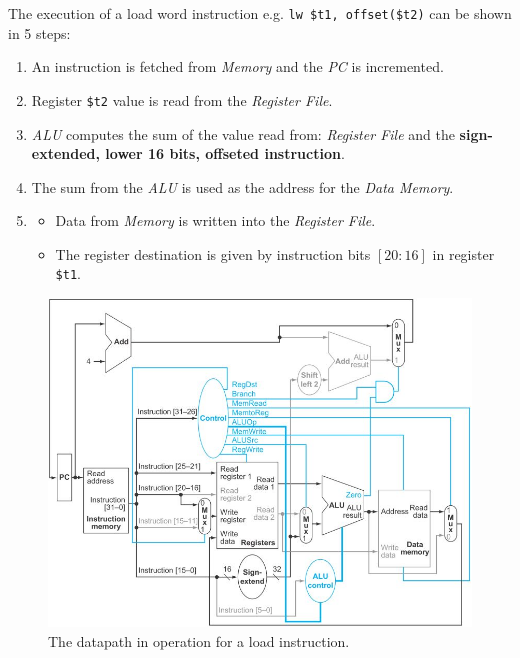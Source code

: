 \documentclass[10pt,a4paper]{article}
\begin{document}
\pagebreak

The execution of a load word instruction e.g. \texttt{lw \$t1, offset(\$t2)} can be shown in 5 steps:
\begin{enumerate}
    \item An instruction is fetched from \textit{Memory} and the \textit{PC} is incremented.
    \item Register \texttt{\$t2} value is read from the \textit{Register File}.
    \item \textit{ALU} computes the sum of the value read from: \textit{Register File} and the 
    \textbf{sign-extended, lower 16 bits, offseted instruction}.
    \item The sum from the \textit{ALU} is used as the address for the \textit{Data Memory}.
    \item 
    \begin{itemize}
        \item Data from \textit{Memory} is written into the \textit{Register File}.
        \item The register destination is given by instruction bits $[20:16]$ in register \texttt{\$t1}.
    \end{itemize} 
\end{enumerate}
\begin{figure} [h!]
    \centering
    \includegraphics[scale=0.7]{lw.JPG}
    \caption{The datapath in operation for a load instruction.}
\end{figure}

\pagebreak
\end{document}
